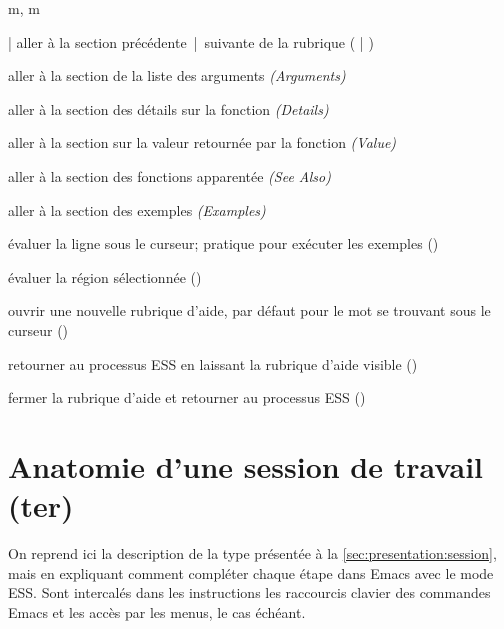 \begin{ttscript}{m, m}
\item[\code{p} | \code{n}] aller à la section précédente~|~suivante de
  la rubrique \newline
  ( |
  )
\item[\code{s a}] aller à la section de la liste des arguments \emph{(Arguments)}
\item[\code{s D}] aller à la section des détails sur la fonction \emph{(Details)}
\item[\code{s v}] aller à la section sur la valeur retournée par la
  fonction \emph{(Value)}
\item[\code{s s}] aller à la section des fonctions apparentée \emph{(See Also)}
\item[\code{s e}] aller à la section des exemples \emph{(Examples)}
\item[\code{l}] évaluer la ligne sous le curseur; pratique pour
  exécuter les exemples \newline
  ()
\item[\code{r}] évaluer la région sélectionnée ()
\item[\code{h}] ouvrir une nouvelle rubrique d'aide, par défaut pour
  le mot se trouvant sous le curseur
  ()
\item[\code{q}] retourner au processus ESS en laissant la rubrique
  d'aide visible \newline
  ()
\item[\code{x}] fermer la rubrique d'aide et retourner au processus
  ESS \newline
  ()
\end{ttscript}



\section{Anatomie d'une session de travail (ter)}
\label{sec:emacs+ess:session}

On reprend ici la description de la %
type présentée à la \autoref{sec:presentation:session}, mais en
expliquant comment compléter chaque étape dans Emacs avec le mode ESS.
Sont intercalés dans les instructions les raccourcis clavier des
commandes Emacs et les accès par les menus, le cas échéant.

